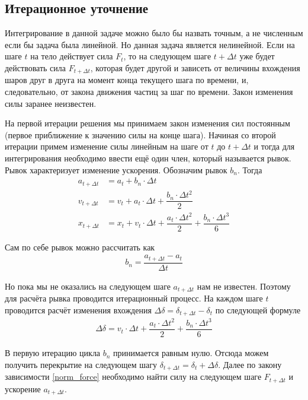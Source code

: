 \documentclass[a4paper]{article}
\begin{document}
 
\subsection{Итерационное уточнение}
\label{iter_subsection}


Интегрирование в данной задаче можно было бы назвать точным, а не численным если бы задача была линейной.
Но данная задача является нелинейной. Если на шаге $t$ на тело действует сила $F_t$, то на следующем шаге $t + \Delta t$ уже будет действовать сила $F_{t + \Delta t}$, которая будет другой и зависеть от величины вхождения шаров друг в друга на момент конца текущего шага по времени, и, следовательно, от закона движения частиц за шаг по времени. 
Закон изменения силы заранее неизвестен.

На первой итерации решения мы принимаем закон изменения сил постоянным (первое приближение к значению силы на конце шага).
Начиная со второй итерации примем изменение силы линейным на шаге от $t$ до $t + \Delta t$  и тогда для интегрирования необходимо ввести ещё один член, который называется рывок. 
Рывок характеризует изменение ускорения.
Обозначим рывок $b_n$.
Тогда
\begin{align*}
a_{t + \Delta t} &= a_t + b_n \cdot \Delta t \\
v_{t + \Delta t} &= v_t + a_t \cdot \Delta t + \dfrac{b_n \cdot \Delta t^2}{2} \\
x_{t + \Delta t} &= x_t + v_t \cdot \Delta t + \dfrac{a_t \cdot \Delta t^2}{2} +  \dfrac{b_n \cdot \Delta t^3}{6}
\end{align*}

Сам по себе рывок можно рассчитать как
\begin{align}
\label{jerk_normal}
b_n = \dfrac{a_{t + \Delta t} - a_{t}}{\Delta t}
\end{align}

Но пока мы не оказались на следующем шаге $a_{t + \Delta t}$ нам не известен.
Поэтому для расчёта рывка проводится итерационный процесс. 
На каждом шаге $t$ проводится расчёт изменения вхождения $\Delta \delta = \delta_{t + \Delta t} - \delta_t$ по следующей формуле
\begin{align*}
\Delta \delta = v_t \cdot \Delta t + \dfrac{a_t \cdot \Delta t^2}{2} +  \dfrac{b_n \cdot \Delta t^3}{6}
\end{align*}

В первую итерацию цикла $b_n$ принимается равным нулю.
Отсюда можем получить перекрытие на следующем шагу $\delta_{t + \Delta t} = \delta_t + \Delta \delta$.
Далее по закону зависимости \ref{norm_force} необходимо найти силу на следующем шаге $F_{t + \Delta t}$ и ускорение $a_{t + \Delta t}$.
\end{document}
